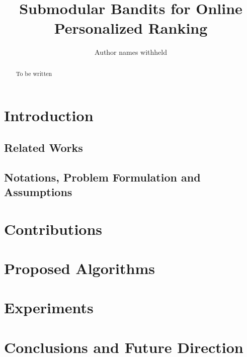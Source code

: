 \documentclass[letterpaper]{article} %
\begin{document}
%
\title{Submodular Bandits for Online Personalized Ranking}
\author{Author names withheld}
\maketitle
\begin{abstract}
To be written
\end{abstract}


\section{Introduction}
\label{intro}



\subsection{Related Works}


\subsection{Notations, Problem Formulation and Assumptions}



\section{Contributions}


\newpage
\section{Proposed Algorithms}



\section{Experiments}



\newpage
\section{Conclusions and Future Direction}





\end{document}
